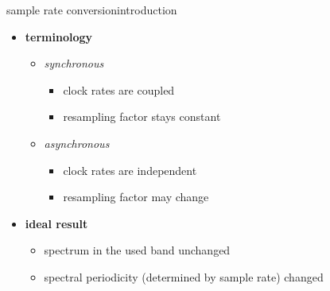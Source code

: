 	\begin{frame}{sample rate conversion}{introduction}
        \begin{itemize}
            \item   \textbf{terminology}
                \begin{itemize}
                    \item   \textit{synchronous}
                        \begin{itemize}
                            \item   clock rates are coupled
                            \item   resampling factor stays constant
                        \end{itemize}
                    \pause
                    \item   \textit{asynchronous}
                        \begin{itemize}
                            \item   clock rates are independent
                            \item   resampling factor may change
                        \end{itemize}
                \end{itemize}
            \bigskip
            \item   \textbf{ideal result}
                \begin{itemize}
                    \item   spectrum in the used band unchanged
                    \item   spectral periodicity (determined by sample rate) changed
                \end{itemize}
        \end{itemize}
    \end{frame}

